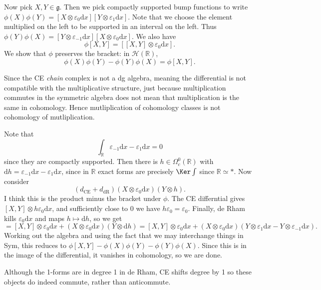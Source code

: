Now  pick $X,Y\in \mathfrak{g} $. Then we pick compactly supported bump functions to write $\phi (X)\phi (Y) = [X\otimes \varepsilon _0\mathrm{d} x][Y\otimes \varepsilon _1 \mathrm{d} x]$. Note that we choose the element multiplied on the left to be supported in an interval on the left. Thus $\phi (Y)\phi (X)=[Y\otimes \varepsilon _{-1} \mathrm{d} x][X\otimes \varepsilon _0\mathrm{d} x]$. We also have
\[
	\phi [X,Y]=[[X,Y]\otimes \varepsilon _0\mathrm{d} x]
.\]
We show that $\phi $ preserves the bracket: in $\mathcal{H} \left(\mathbb{R}  \right) $,
\[
	\phi (X)\phi (Y)-\phi (Y)\phi (X)=\phi [X,Y]
.\]
\begin{remark}
	Since the CE \emph{chain} complex is not a dg algebra, meaning the differential is not compatible with the multiplicative structure, just because multiplication commutes in the symmetric algebra does not mean that multiplication is the same in cohomology. Hence mutliplication of cohomology classes is not cohomology of mutliplication.
\end{remark}

Note that
\[
	\int_\mathbb{R} \varepsilon _{-1} \mathrm{d} x - \varepsilon _1\mathrm{d} x =0
\]
since they are compactly supported. Then there is $h\in \Omega ^0_c(\mathbb{R} )$ with $\mathrm{d} h = \varepsilon _{-1} \mathrm{d} x - \varepsilon _1 \mathrm{d} x$, since in $\mathbb{R} $ exact forms are precisely $\Ker \int$ since $\mathbb{R} \simeq *$. Now consider
\[
	(d_{\mathrm{CE} } +d_{\mathrm{dR} } )(X\otimes \varepsilon _0\mathrm{d} x)(Y\otimes h)
.\]
I think this is the product minus the bracket under $\phi $. The CE differntial gives $[X,Y]\otimes h\varepsilon _0\mathrm{d} x$, and sufficiently close to 0 we have $h\varepsilon _0=\varepsilon _0$. Finally, de Rham kills $\varepsilon _0\mathrm{d} x$ and maps $h\mapsto \mathrm{d} h$, so we get
\[
	=[X,Y]\otimes \varepsilon _0\mathrm{d} x + (X\otimes \varepsilon _0\mathrm{d} x)(Y\otimes \mathrm{d} h) = [X,Y]\otimes \varepsilon _0\mathrm{d} x + (X\otimes \varepsilon _0\mathrm{d} x)(Y\otimes \varepsilon _1\mathrm{d} x - Y\otimes \varepsilon _{-1}\mathrm{d} x)
.\]
Working out the algebra and using the fact that we may interchange things in Sym, this reduces to $\phi [X,Y]-\phi (X)\phi (Y)-\phi (Y)\phi (X)$. Since this is in the image of the differential, it vanishes in cohomology, so we are done.

\begin{remark}
	Although the 1-forms are in degree 1 in de Rham, CE shifts degree by 1 so these objects do indeed commute, rather than anticommute.
\end{remark}

